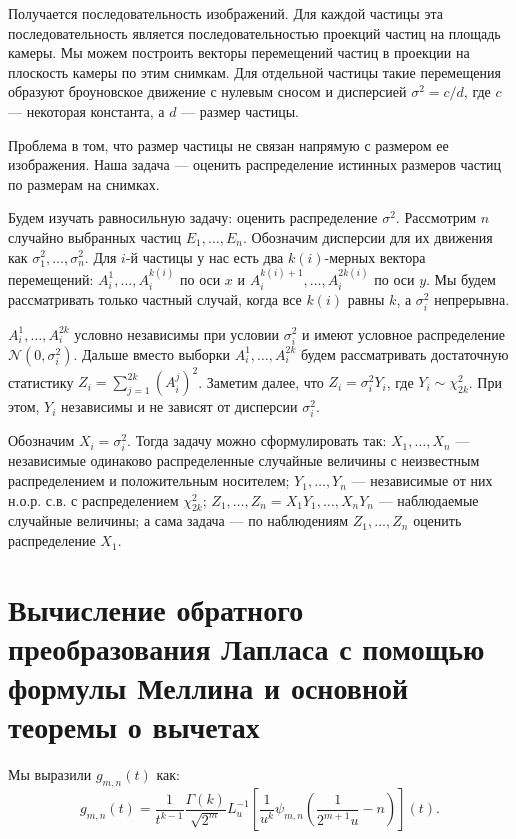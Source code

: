 \documentclass[12pt, a4paper]{report}
\begin{document}
Получается последовательность изображений. Для каждой частицы эта последовательность является
последовательностью проекций частиц на площадь камеры. Мы можем построить векторы перемещений
частиц в проекции на плоскость камеры по этим снимкам. Для отдельной частицы такие перемещения
образуют броуновское движение с нулевым сносом и дисперсией $\sigma^2 = c/d$, где $c$ --- некоторая
константа, а $d$ --- размер частицы.

Проблема в том, что размер частицы не связан напрямую с размером ее изображения. Наша задача ---
оценить распределение истинных размеров частиц по размерам на снимках.

Будем изучать равносильную задачу: оценить распределение $\sigma^2$.
Рассмотрим $n$ случайно выбранных частиц $E_1, \dots, E_n$. Обозначим дисперсии для
их движения как $\sigma_1^2, \dots, \sigma_n^2$. Для $i$-й частицы у нас есть два
$k(i)$-мерных вектора перемещений: $A_i^1, \dots, A_i^{k(i)}$ по оси $x$ 
и $A_i^{k(i)+1}, \dots, A_i^{2k(i)}$ по оси $y$. Мы будем рассматривать только частный случай,
когда все $k(i)$ равны $k$, а $\sigma_i^2$ непрерывна.

$A_i^1, \dots, A_i^{2k}$ условно независимы при условии $\sigma_i^2$ и имеют условное
распределение $\mathcal{N}\left(0, \sigma_i^2\right)$. Дальше вместо выборки
$A_i^1, \dots, A_i^{2k}$ будем рассматривать достаточную статистику $Z_i = \sum\limits_{j=1}^{2k} \left(A_i^j\right)^2$.
Заметим далее, что $Z_i = \sigma_i^2 Y_i$, где $Y_i \sim \chi^2_{2k}$.
При этом, $Y_i$ независимы и не зависят от дисперсии $\sigma_i^2$.

Обозначим $X_i = \sigma_i^2$. Тогда задачу можно сформулировать так:
$X_1, \dots, X_n$ --- независимые одинаково распределенные случайные величины
с неизвестным распределением и положительным носителем; 
$Y_1, \dots, Y_n$ --- независимые от них н.о.р. с.в. с распределением $\chi^2_{2k}$;
$Z_1, \dots, Z_n = X_1 Y_1, \dots, X_n Y_n$ --- наблюдаемые случайные величины;
а сама задача --- по наблюдениям $Z_1, ..., Z_n$ оценить распределение $X_1$.
%

%
\chapter{Вычисление обратного преобразования Лапласа с помощью формулы Меллина и основной теоремы о вычетах}

Мы выразили $g_{m,n}(t)$ как:
\begin{equation}\label{eq:gmn}
    g_{m,n}(t) = 
    \frac{1}{t^{k-1}} \frac{\Gamma(k)}{\sqrt{2^m}} L^{-1}_u \left[ \frac{1}{u^k} \psi_{m,n} \left( \frac{1}{2^{m+1} u} - n \right) \right] (t).
\end{equation}
\end{document}

